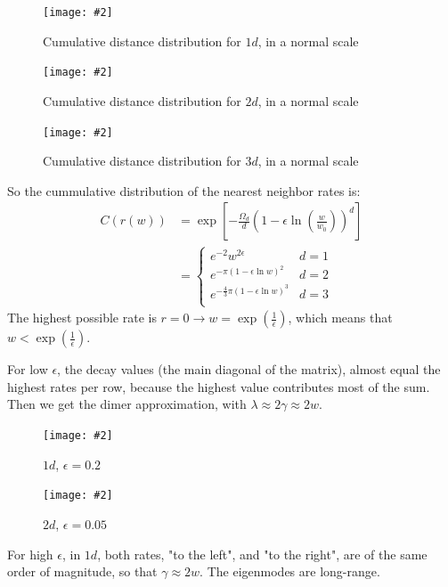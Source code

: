 \documentclass[onecolumn,fleqn,notitlepage,secnumarabic]{revtex4}
\newcommand{\dontincludegraphics}[2][]{\texttt{[image: \#2]}}
\begin{document}
\begin{figure}[H]
    \dontincludegraphics[clip,width=0.9\hsize]{dist_1d_1000}
    \caption{Cumulative distance distribution for $1d$, in a normal scale}
    \label{fig:1d_dist}
\end{figure}
\begin{figure}[H]
    \dontincludegraphics[clip,width=0.9\hsize]{dist_2d_1000}
    \caption{Cumulative distance distribution for $2d$, in a normal scale}
    \label{fig:2d_dist}
\end{figure}
\begin{figure}[H]
    \dontincludegraphics[clip,width=0.9\hsize]{dist_3d_1000}
    \caption{Cumulative distance distribution for $3d$, in a normal scale}
    \label{fig:3d_dist}
\end{figure}

So the cummulative distribution of the nearest neighbor rates is:
\begin{align}
    C(r(w)) &= \exp\left[{-\frac{\Omega_d}{d}\left(1-\epsilon\ln \left(\frac{w}{w_0}\right)\right)^d}\right] \\
&= \begin{cases} 
    e^{-2}w^{2\epsilon} &d=1 \\
e^{-\pi(1-\epsilon\ln w)^2} &d=2 \\
e^{-\frac{4}{3}\pi(1-\epsilon\ln w)^3} &d=3 \\
   \end{cases}
\end{align}
The highest possible rate is $r=0\rightarrow w=\exp(\frac{1}{\epsilon})$, which means that $w < \exp(\frac{1}{\epsilon})$.

For low $\epsilon$, the decay values (the main diagonal of the matrix), almost equal the highest rates per row, because the highest value contributes most of the sum. Then we get the dimer approximation, with $\lambda \approx 2\gamma \approx 2w$. 

\begin{figure}[H]
    \dontincludegraphics[clip,width=0.9\hsize]{{{exp_1d_0.2_pn}}}
    \caption{$1d$, $\epsilon = 0.2$}
\end{figure}
\begin{figure}[H]
    \dontincludegraphics[clip,width=0.9\hsize]{{{exp_2d_0.05_pn}}}
    \caption{$2d$, $\epsilon = 0.05$}
\end{figure}

For high $\epsilon$, in $1d$, both rates, "to the left", and "to the right", are of the same order of magnitude, so that $\gamma \approx 2w$. The eigenmodes are long-range.
\end{document}
